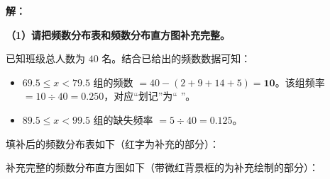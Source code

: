 \vspace{0.4cm}

\textbf{解：}

\textbf{（1）请把频数分布表和频数分布直方图补充完整。}

\vspace{0.2cm}
已知班级总人数为 $40$ 名。结合已给出的频数数据可知：
\begin{itemize}
  \item $69.5 \leqslant x < 79.5$ 组的频数 $= 40 - (2 + 9 + 14 + 5) = \boldsymbol{10}$。该组频率 $= 10 \div 40 = \boldsymbol{0.250}$，对应“划记”为“\zhengV{} \zhengV{}”。
  \item $89.5 \leqslant x < 99.5$ 组的缺失频率 $= 5 \div 40 = \boldsymbol{0.125}$。
\end{itemize}

填补后的频数分布表如下（红字为补充的部分）：

\vspace{0.4cm}
\begin{center}
\renewcommand{\arraystretch}{1.6}
\end{center}

\vspace{0.6cm}
补充完整的频数分布直方图如下（带微红背景框的为补充绘制的部分）：

